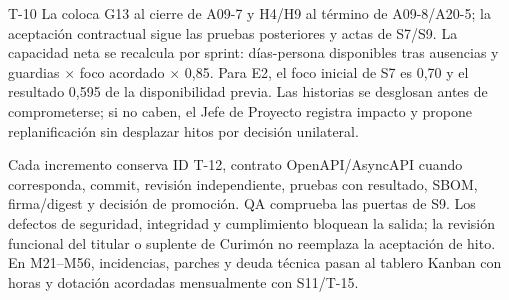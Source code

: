 \begin{formulario}{T-10}
La  coloca G13 al cierre de A09-7 y H4/H9 al término de A09-8/A20-5; la aceptación contractual sigue las pruebas posteriores y actas de S7/S9. La capacidad neta se recalcula por sprint: días-persona disponibles tras ausencias y guardias $\times$ foco acordado $\times$ 0,85. Para E2, el foco inicial de S7 es 0,70 y el resultado 0,595 de la disponibilidad previa. Las historias se desglosan antes de comprometerse; si no caben, el Jefe de Proyecto registra impacto y propone replanificación sin desplazar hitos por decisión unilateral.

Cada incremento conserva ID T-12, contrato OpenAPI/AsyncAPI cuando corresponda, commit, revisión independiente, pruebas con resultado, SBOM, firma/digest y decisión de promoción. QA comprueba las puertas de S9. Los defectos de seguridad, integridad y cumplimiento bloquean la salida; la revisión funcional del titular o suplente de Curimón no reemplaza la aceptación de hito. En M21–M56, incidencias, parches y deuda técnica pasan al tablero Kanban con horas y dotación acordadas mensualmente con S11/T-15.
\end{formulario}

